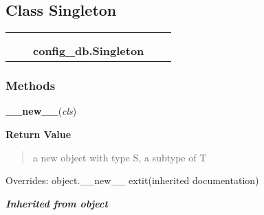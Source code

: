 
\subsection{Class Singleton}

    \label{config_db:Singleton}
\begin{tabular}{cccccc}
\multicolumn{2}{r}{\settowidth{\BCL}{object}\multirow{2}{\BCL}{object}}
&&
  \\\cline{3-3}
  &&\multicolumn{1}{c|}{}
&&
  \\
&&\multicolumn{2}{l}{\textbf{config\_db.Singleton}}
\end{tabular}



  \subsubsection{Methods}

    \vspace{0.5ex}

\hspace{.8\funcindent}\begin{boxedminipage}{\funcwidth}

    \raggedright \textbf{\_\_new\_\_}(\textit{cls})

\setlength{\parskip}{2ex}
\setlength{\parskip}{1ex}
      \textbf{Return Value}
    \vspace{-1ex}

      \begin{quote}
      a new object with type S, a subtype of T

      \end{quote}

      Overrides: object.\_\_new\_\_ 	extit{(inherited documentation)}

    \end{boxedminipage}


\large{\textbf{\textit{Inherited from object}}}

